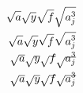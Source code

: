 \documentclass{book}
\begin{document}
\begin{eqnarray*}
\sqrt{a} \sqrt{y}\sqrt{f}\sqrt{a^{3}_{j}}\\ %
\sqrt{\smash[b]{a}}\sqrt{\smash[b]{y}}\sqrt{\smash[b]{f}}\sqrt{\smash[b]{a^{3}_{j}}}\\
\sqrt{\smash[t]{a}}\sqrt{\smash[t]{y}}\sqrt{\smash[t]{f}}\sqrt{\smash[t]{a^{3}_{j}}}\\
\sqrt{\smash{a}} \sqrt{\smash{y}} \sqrt{\smash{f}} \sqrt{\smash{a^{3}_{j}}}
\end{eqnarray*}
\end{document}
